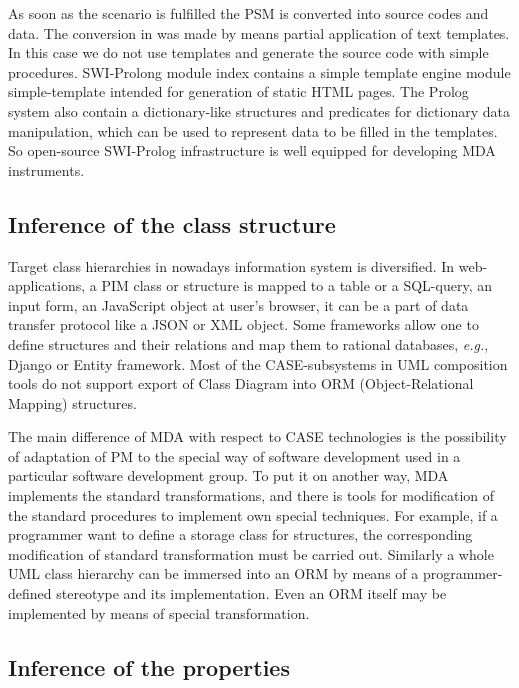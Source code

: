 \documentclass[runningheads]{llncs}
\begin{document}
As soon as the scenario is fulfilled the PSM is converted into source codes and data.  The conversion in \cite{tereh1} was made by means partial application of text templates.  In this case we do not use templates and generate the source code with simple procedures.  SWI-Prolong module index contains a simple template engine module simple-template intended for generation of static HTML pages.  The Prolog system also contain a dictionary-like structures and predicates for dictionary data manipulation, which can be used to represent data to be filled in the templates.  So open-source SWI-Prolog infrastructure is well equipped for developing MDA instruments.

\subsection{Inference of the class structure}
\label{sec:infstru}

Target class hierarchies in nowadays information system is diversified.  In web-applications, a PIM class or structure is mapped to a table or a SQL-query, an input form, an JavaScript object at user's browser, it can be a part of data transfer protocol like a JSON or XML object.  Some frameworks allow one to define structures and their relations and map them to rational databases, \emph{e.g.}, Django \cite{stratego} or Entity framework.  Most of the CASE-subsystems in UML composition tools do not support export of Class Diagram into ORM (Object-Relational Mapping) structures.

The main difference of MDA with respect to CASE technologies is the possibility of adaptation of PM to the special way of software development used in a particular software development group.  To put it on another way, MDA implements the standard transformations, and there is tools for modification of the standard procedures to implement own special techniques.  For example, if a programmer want to define a storage class for structures, the corresponding modification of standard transformation must be carried out.  Similarly a whole UML class hierarchy can be immersed into an ORM by means of a programmer-defined stereotype and its implementation.  Even an ORM itself may be implemented by means of special transformation.

\subsection{Inference of the properties}
\label{sec:infprop}
\end{document}
